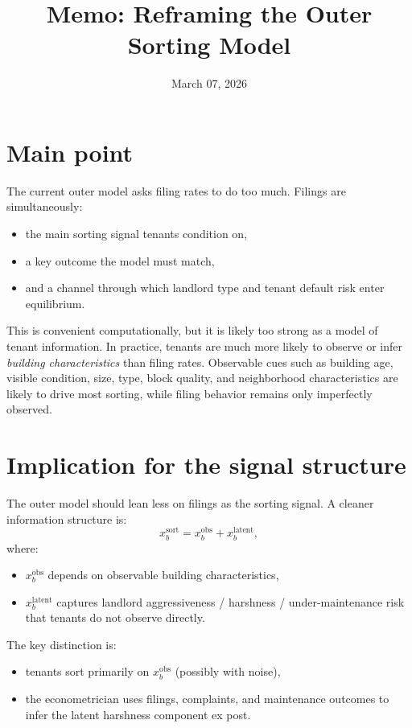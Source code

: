 \documentclass[11pt]{article}
\title{Memo: Reframing the Outer Sorting Model}
\author{}
\date{March 07, 2026}
\begin{document}
\maketitle

\section{Main point}
The current outer model asks filing rates to do too much. Filings are simultaneously:
\begin{itemize}
    \item the main sorting signal tenants condition on,
    \item a key outcome the model must match,
    \item and a channel through which landlord type and tenant default risk enter equilibrium.
\end{itemize}
This is convenient computationally, but it is likely too strong as a model of tenant information. In practice, tenants are much more likely to observe or infer \emph{building characteristics} than filing rates. Observable cues such as building age, visible condition, size, type, block quality, and neighborhood characteristics are likely to drive most sorting, while filing behavior remains only imperfectly observed.

\section{Implication for the signal structure}
The outer model should lean less on filings as the sorting signal. A cleaner information structure is:
\[
x_b^{\text{sort}} = x_b^{\text{obs}} + x_b^{\text{latent}},
\]
where:
\begin{itemize}
    \item $x_b^{\text{obs}}$ depends on observable building characteristics,
    \item $x_b^{\text{latent}}$ captures landlord aggressiveness / harshness / under-maintenance risk that tenants do not observe directly.
\end{itemize}

The key distinction is:
\begin{itemize}
    \item tenants sort primarily on $x_b^{\text{obs}}$ (possibly with noise),
    \item the econometrician uses filings, complaints, and maintenance outcomes to infer the latent harshness component ex post.
\end{itemize}
\end{document}
